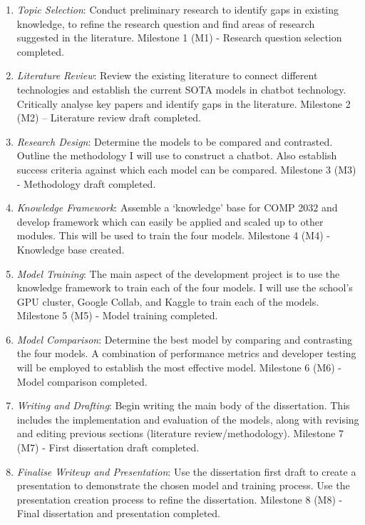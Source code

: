 \documentclass{article}
\begin{document}
\begin{enumerate}[\textbf{WP-}1]
    \item \textit{Topic Selection}: Conduct preliminary research to identify gaps in existing knowledge, to refine the research question and find areas of research suggested in the literature. Milestone 1 (M1) - Research question selection completed.

     \item \textit{Literature Review}: Review the existing literature to connect different technologies and establish the current SOTA models in chatbot technology. Critically analyse key papers and identify gaps in the literature. Milestone 2 (M2) – Literature review draft completed.
    
     \item \textit{Research Design}: Determine the models to be compared and contrasted. Outline the methodology I will use to construct a chatbot. Also establish success criteria against which each model can be compared.  Milestone 3 (M3) - Methodology draft completed.
    
     \item \textit{Knowledge Framework}: Assemble a `knowledge' base for COMP 2032 and develop framework which can easily be applied and scaled up to other modules. This will be used to train the four models. Milestone 4 (M4) - Knowledge base created.
    
     \item \textit{Model Training}: The main aspect of the development project is to use the knowledge framework to train each of the four models. I will use the school's GPU cluster, Google Collab, and Kaggle to train each of the models. Milestone 5 (M5) - Model training completed.
    
     \item \textit{Model Comparison}: Determine the best model by comparing and contrasting the four models. A combination of performance metrics and developer testing will be employed to establish the most effective model. Milestone 6 (M6) - Model comparison completed.
    
     \item \textit{Writing and Drafting}: Begin writing the main body of the dissertation. This includes the implementation and evaluation of the models, along with revising and editing previous sections (literature review/methodology). Milestone 7 (M7) - First dissertation draft completed.
    
     \item \textit{Finalise Writeup and Presentation}: Use the dissertation first draft to create a presentation to demonstrate the chosen model and training process. Use the presentation creation process to refine the dissertation. Milestone 8 (M8) - Final dissertation and presentation completed.

\end{enumerate}
\end{document}
